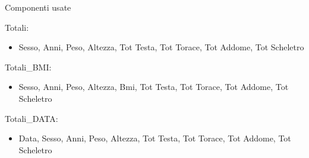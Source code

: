 \documentclass{beamer}
\begin{document}
\begin{frame}{Componenti usate}
	\begin{block}{}
		Totali:
		\begin{itemize}
			\item Sesso, Anni, Peso, Altezza, Tot Testa, Tot Torace, Tot Addome, Tot Scheletro
		\end{itemize}
	\end{block}
	\begin{block}{}
		Totali\_BMI:
		\begin{itemize}
			\item Sesso, Anni, Peso, Altezza, Bmi, Tot Testa, Tot Torace, Tot Addome, Tot Scheletro
		\end{itemize}
	\end{block}
	\begin{block}{}
		Totali\_DATA:
		\begin{itemize}
			\item Data, Sesso, Anni, Peso, Altezza, Tot Testa, Tot Torace, Tot Addome, Tot Scheletro
		\end{itemize}
	\end{block}
\end{frame}
\end{document}
